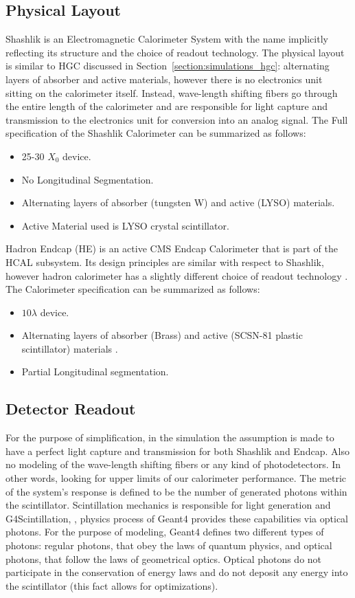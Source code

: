 \subsection{Physical Layout}
Shashlik is an Electromagnetic Calorimeter System with the name implicitly reflecting its structure and the choice of readout technology. The physical layout is similar to HGC discussed in Section~\ref{section:simulations_hgc}: alternating layers of absorber and active materials, however there is no electronics unit sitting on the calorimeter itself. Instead, wave-length shifting fibers go through the entire length of the calorimeter and are responsible for light capture and transmission to the electronics unit for conversion into an analog signal. The Full specification of the Shashlik Calorimeter can be summarized as follows:
\begin{itemize}
    \item 25-30 $X_0$ device.
    \item No Longitudinal Segmentation.
    \item Alternating layers of absorber (tungsten W) and active (LYSO) materials.
    \item Active Material used is LYSO crystal scintillator.
\end{itemize}
Hadron Endcap (HE) is an active CMS Endcap Calorimeter that is part of the HCAL subsystem. Its design principles are similar with respect to Shashlik, however hadron calorimeter has a slightly different choice of readout technology \cite{Baiatian:2008zz}. The Calorimeter specification can be summarized as follows:
\begin{itemize}
    \item $10\lambda$ device.
    \item Alternating layers of absorber (Brass) and active (SCSN-81 plastic scintillator) materials \cite{Baiatian:2008zz}.
    \item Partial Longitudinal segmentation.
\end{itemize}

\subsection{Detector Readout}
For the purpose of simplification, in the simulation the assumption is made to have a perfect light capture and transmission for both Shashlik and Endcap. Also no modeling of the wave-length shifting fibers or any kind of photodetectors. In other words, looking for upper limits of our calorimeter performance. The metric of the system's response is defined to be the number of generated photons within the scintillator. Scintillation mechanics is responsible for light generation and G4Scintillation, \cite{geant4}, physics process of {\sc Geant4} provides these capabilities via optical photons. For the purpose of modeling, {\sc Geant4} defines two different types of photons: regular photons, that obey the laws of quantum physics, and optical photons, that follow the laws of geometrical optics. Optical photons do not participate in the conservation of energy laws and do not deposit any energy into the scintillator (this fact allows for optimizations).

